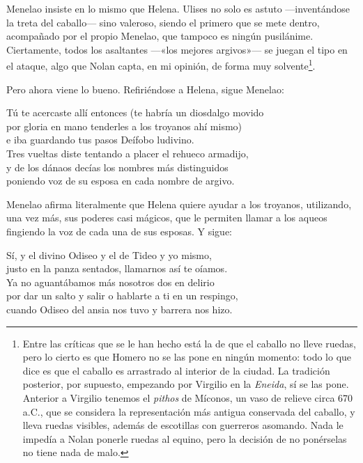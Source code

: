 Menelao insiste en lo mismo que Helena. Ulises no solo es astuto ---inventándose la treta del caballo--- sino valeroso, siendo el primero que se mete dentro, acompañado por el propio Menelao, que tampoco es ningún pusilánime. Ciertamente, todos los asaltantes ---«los mejores argivos»--- se juegan el tipo en el ataque, algo que Nolan capta, en mi opinión, de forma muy solvente\footnote{Entre las críticas que se le han hecho está la de que el caballo no lleve ruedas, pero lo cierto es que Homero no se las pone en ningún momento: todo lo que dice es que el caballo es arrastrado al interior de la ciudad. La tradición posterior, por supuesto, empezando por Virgilio en la \emph{Eneida}, sí se las pone. Anterior a Virgilio tenemos el \emph{pithos} de Míconos, un vaso de relieve circa 670 a.C., que se considera la representación más antigua conservada del caballo, y lleva ruedas visibles, además de escotillas con guerreros asomando. Nada le impedía a Nolan ponerle ruedas al equino, pero la decisión de no ponérselas no tiene nada de malo.}.

Pero ahora viene lo bueno. Refiriéndose a Helena, sigue Menelao:

\begin{versocita}
Tú te acercaste allí entonces (te habría un diosdalgo movido\\
por gloria en mano tenderles a los troyanos ahí mismo)\\
e iba guardando tus pasos Deífobo ludivino.\\
Tres vueltas diste tentando a placer el rehueco armadijo,\\
y de los dánaos decías los nombres más distinguidos\\
poniendo voz de su esposa en cada nombre de argivo.
\end{versocita}

Menelao afirma literalmente que Helena quiere ayudar a los troyanos, utilizando, una vez más, sus poderes casi mágicos, que le permiten llamar a los aqueos fingiendo la voz de cada una de sus esposas. Y sigue:


\begin{versocita}
Sí, y el divino Odiseo y el de Tideo y yo mismo,\\
justo en la panza sentados, llamarnos así te oíamos.\\
Ya no aguantábamos más nosotros dos en delirio\\
por dar un salto y salir o hablarte a ti en un respingo,\\
cuando Odiseo del ansia nos tuvo y barrera nos hizo.
\end{versocita}

